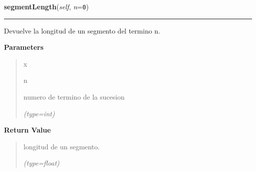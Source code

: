 \hspace{.8\funcindent}\begin{boxedminipage}{\funcwidth}

    \raggedright \textbf{segmentLength}(\textit{self}, \textit{n}={\tt 0})

    \vspace{-1.5ex}

    \rule{\textwidth}{0.5\fboxrule}
\setlength{\parskip}{2ex}
    Devuelve la longitud de un segmento del termino n.

\setlength{\parskip}{1ex}
      \textbf{Parameters}
      \vspace{-1ex}

      \begin{quote}
        \begin{Ventry}{x}

          \item[n]

          numero de termino de la sucesion

            {\it (type=int)}

        \end{Ventry}

      \end{quote}

      \textbf{Return Value}
    \vspace{-1ex}

      \begin{quote}
      longitud de un segmento.

      {\it (type=float)}

      \end{quote}

    \end{boxedminipage}

    \label{FractalZE:arbol:Arbol:countSegments}

    \vspace{0.5ex}

